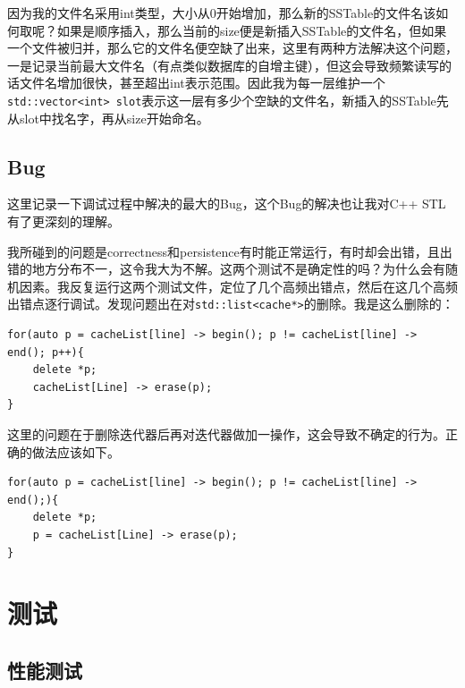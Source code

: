 \documentclass[fontset=windows]{article}
\begin{document}
因为我的文件名采用int类型，大小从0开始增加，那么新的SSTable的文件名该如何取呢？如果是顺序插入，那么当前的size便是新插入SSTable的文件名，但如果一个文件被归并，那么它的文件名便空缺了出来，这里有两种方法解决这个问题，一是记录当前最大文件名（有点类似数据库的自增主键），但这会导致频繁读写的话文件名增加很快，甚至超出int表示范围。因此我为每一层维护一个\verb|std::vector<int> slot|表示这一层有多少个空缺的文件名，新插入的SSTable先从slot中找名字，再从size开始命名。

\subsection{Bug}
这里记录一下调试过程中解决的最大的Bug，这个Bug的解决也让我对C++ STL有了更深刻的理解。

我所碰到的问题是correctness和persistence有时能正常运行，有时却会出错，且出错的地方分布不一，这令我大为不解。这两个测试不是确定性的吗？为什么会有随机因素。我反复运行这两个测试文件，定位了几个高频出错点，然后在这几个高频出错点逐行调试。发现问题出在对\verb|std::list<cache*>|的删除。我是这么删除的：
\begin{lstlisting}
for(auto p = cacheList[line] -> begin(); p != cacheList[line] -> end(); p++){
    delete *p;
    cacheList[Line] -> erase(p);
}
\end{lstlisting}

这里的问题在于删除迭代器后再对迭代器做加一操作，这会导致不确定的行为。正确的做法应该如下。
\begin{lstlisting}
for(auto p = cacheList[line] -> begin(); p != cacheList[line] -> end();){
    delete *p;
    p = cacheList[Line] -> erase(p);
}
\end{lstlisting}

\section{测试}
\subsection{性能测试}
\end{document}
